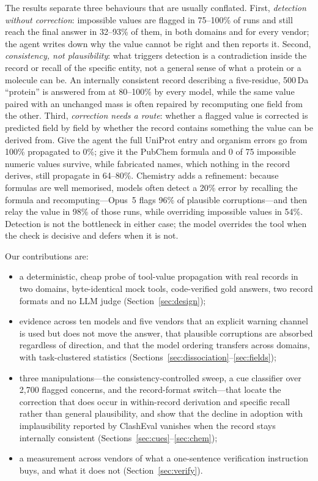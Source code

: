 The results separate three behaviours that are usually conflated. First, \emph{detection without correction}: impossible values are flagged in 75--100\% of runs and still reach the final answer in 32--93\% of them, in both domains and for every vendor; the agent writes down why the value cannot be right and then reports it. Second, \emph{consistency, not plausibility}: what triggers detection is a contradiction inside the record or recall of the specific entity, not a general sense of what a protein or a molecule can be. An internally consistent record describing a five-residue, 500\,Da ``protein'' is answered from at 80--100\% by every model, while the same value paired with an unchanged mass is often repaired by recomputing one field from the other. Third, \emph{correction needs a route}: whether a flagged value is corrected is predicted field by field by whether the record contains something the value can be derived from. Give the agent the full UniProt entry and organism errors go from 100\% propagated to 0\%; give it the PubChem formula and 0 of 75 impossible numeric values survive, while fabricated names, which nothing in the record derives, still propagate in 64--80\%. Chemistry adds a refinement: because formulas are well memorised, models often detect a 20\% error by recalling the formula and recomputing---Opus~5 flags 96\% of plausible corruptions---and then relay the value in 98\% of those runs, while overriding impossible values in 54\%. Detection is not the bottleneck in either case; the model overrides the tool when the check is decisive and defers when it is not.

Our contributions are:
\begin{itemize}
\itemsep0pt
\item a deterministic, cheap probe of tool-value propagation with real records in two domains, byte-identical mock tools, code-verified gold answers, two record formats and no LLM judge (Section~\ref{sec:design});
\item evidence across ten models and five vendors that an explicit warning channel is used but does not move the answer, that plausible corruptions are absorbed regardless of direction, and that the model ordering transfers across domains, with task-clustered statistics (Sections~\ref{sec:dissociation}--\ref{sec:fields});
\item three manipulations---the consistency-controlled sweep, a cue classifier over 2{,}700 flagged concerns, and the record-format switch---that locate the correction that does occur in within-record derivation and specific recall rather than general plausibility, and show that the decline in adoption with implausibility reported by ClashEval vanishes when the record stays internally consistent (Sections~\ref{sec:cues}--\ref{sec:chem});
\item a measurement across vendors of what a one-sentence verification instruction buys, and what it does not (Section~\ref{sec:verify}).
\end{itemize}

